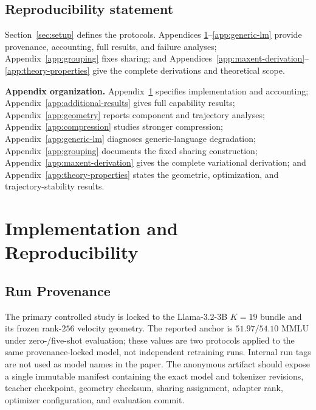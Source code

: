 \documentclass{article}
\theoremstyle{plain}
\theoremstyle{definition}
\theoremstyle{remark}
\begin{document}

\subsection*{Reproducibility statement}
Section~\ref{sec:setup} defines the protocols.  Appendices
\ref{app:implementation}--\ref{app:generic-lm} provide provenance, accounting,
full results, and failure analyses; Appendix~\ref{app:grouping} fixes sharing;
and Appendices~\ref{app:maxent-derivation}--\ref{app:theory-properties} give the
complete derivations and theoretical scope.

\begingroup
\sloppy


\endgroup

\clearpage
\appendix
{}


\noindent\textbf{Appendix organization.}
Appendix~\ref{app:implementation} specifies implementation and accounting;
Appendix~\ref{app:additional-results} gives full capability results;
Appendix~\ref{app:geometry} reports component and trajectory analyses;
Appendix~\ref{app:compression} studies stronger compression;
Appendix~\ref{app:generic-lm} diagnoses generic-language degradation;
Appendix~\ref{app:grouping} documents the fixed sharing construction;
Appendix~\ref{app:maxent-derivation} gives the complete variational derivation; and
Appendix~\ref{app:theory-properties} states the geometric, optimization, and
trajectory-stability results.

\section{Implementation and Reproducibility}
\label{app:implementation}

\subsection{Run Provenance}

The primary controlled study is locked to the Llama-3.2-3B $K=19$ bundle and its
frozen rank-$256$ velocity geometry.  The reported anchor is $51.97/54.10$ MMLU
under zero-/five-shot evaluation; these values are two protocols applied to the
same provenance-locked model, not independent retraining runs.  Internal run tags
are not used as model names in the paper.  The anonymous artifact should expose a
single immutable manifest containing the exact model and tokenizer revisions,
teacher checkpoint, geometry checksum, sharing assignment, adapter rank, optimizer
configuration, and evaluation commit.
\end{document}
